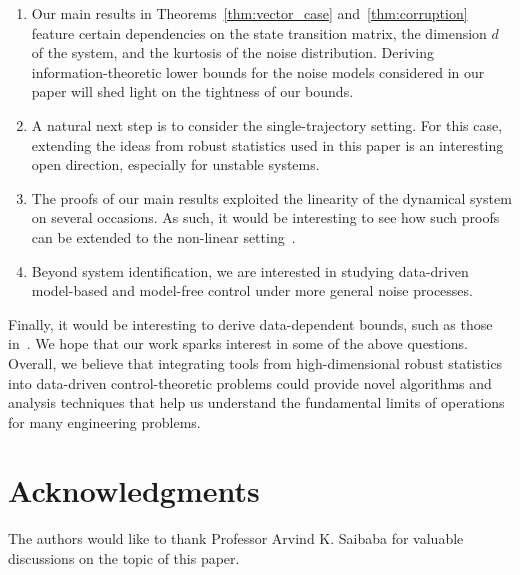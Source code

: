 \documentclass[letterpaper, 11 pt]{article}
\begin{document}
\begin{enumerate}
\item Our main results in Theorems~\ref{thm:vector_case} and~\ref{thm:corruption} feature certain dependencies on the state transition matrix, the dimension $d$ of the system, and the kurtosis of the noise distribution. Deriving information-theoretic lower bounds for the noise models considered in our paper will shed light on the tightness of our bounds. 

\item A natural next step is to consider the single-trajectory setting. For this case, extending the ideas from robust statistics used in this paper is an interesting open direction, especially for unstable systems. 

\item The proofs of our main results exploited the linearity of the dynamical system on several occasions. As such, it would be interesting to see how such proofs can be extended to the non-linear setting~\cite{ziemann2022single, foster2020learning}. 

\item Beyond system identification, we are interested in studying data-driven model-based and model-free control under more general noise processes. 
\end{enumerate}

Finally, it would be interesting to derive data-dependent bounds, such as those in~\cite{pananjady2020instance}. We hope that our work sparks interest in some of the above questions. Overall, we believe that integrating tools from high-dimensional robust statistics into data-driven control-theoretic problems could provide novel algorithms and analysis techniques that help us understand the fundamental limits of operations for many engineering problems. 

\section{Acknowledgments} The authors would like to thank Professor Arvind K. Saibaba for valuable discussions on the topic of this paper. 




\newpage

\appendix
\end{document}

